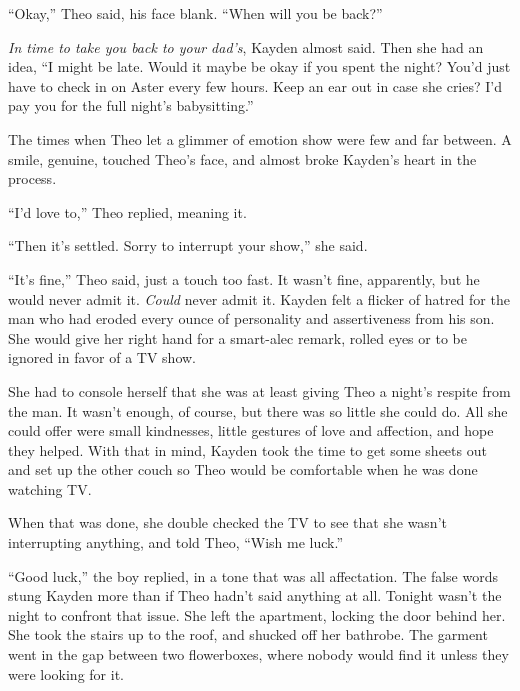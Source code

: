 ``Okay,''  Theo said, his face blank.  ``When will you be back?''



\emph{In time to take you back to your dad's}, Kayden almost said.  Then she had an idea, ``I might be late.  Would it maybe be okay if you spent the night?  You'd just have to check in on Aster every few hours.  Keep an ear out in case she cries?  I'd pay you for the full night's babysitting.''



The times when Theo let a glimmer of emotion show were few and far between.  A smile, genuine, touched Theo's face, and almost broke Kayden's heart in the process.



``I'd love to,'' Theo replied, meaning it.



``Then it's settled.  Sorry to interrupt your show,'' she said.



``It's fine,'' Theo said, just a touch too fast.  It wasn't fine, apparently, but he would never admit it.  \emph{Could} never admit it.  Kayden felt a flicker of hatred for the man who had eroded every ounce of personality and assertiveness from his son.  She would give her right hand for a smart-alec remark, rolled eyes or to be ignored in favor of a TV show.



She had to console herself that she was at least giving Theo a night's respite from the man.  It wasn't enough, of course, but there was so little she could do.  All she could offer were small kindnesses, little gestures of love and affection, and hope they helped.  With that in mind, Kayden took the time to get some sheets out and set up the other couch so Theo would be comfortable when he was done watching TV.



When that was done, she double checked the TV to see that she wasn't interrupting anything, and told Theo, ``Wish me luck.''



``Good luck,'' the boy replied, in a tone that was all affectation.  The false words stung Kayden more than if Theo hadn't said anything at all.  Tonight wasn't the night to confront that issue.  She left the apartment, locking the door behind her.  She took the stairs up to the roof, and shucked off her bathrobe.   The garment went in the gap between two flowerboxes, where nobody would find it unless they were looking for it.



